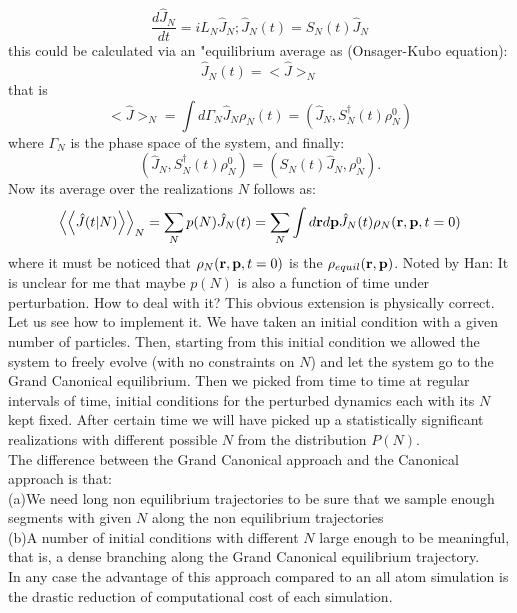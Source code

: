 \documentclass[aps,pre,preprint,unsortedaddress]{revtex4}
\newcommand{\bluec}[1]{{\color{blue} #1}}
\begin{document}
\begin{equation}
\frac{d \hat{J}_{N}}{dt}=iL_{N}\hat{J}_{N};\hat{J}_{N}(t)=S_{N}(t)\hat{J}_{N}
\end{equation}
this could be calculated via an "equilibrium average as (Onsager-Kubo equation):
\begin{equation}
\hat{J}_{N}(t)=<\hat{J}>_{N}
\end{equation}
that is
\begin{equation}
<\hat{J}>_{N}=\int d\Gamma_{N}\hat{J}_{N}\rho_{N}(t)=(\hat{J}_{N},S^{\dagger}_{N}(t)\rho_{N}^{0})
\end{equation}
where $\Gamma_{N}$ is the phase space of the system, and finally:
\begin{equation}
 (\hat{J}_{N},S^{\dagger}_{N}(t)\rho_{N}^{0})=(S_{N}(t)\hat{J}_{N}, \rho_{N}^{0}).
\end{equation}
Now its average over the realizations $N$ follows as:
\begin{equation}
\left<\left<\hat{J}(t|N)\right>\right>_{N}=\sum_{N}p(N)\hat{J}_{N}(t)=\sum_{N}\int d{\bf r}d{\bf p}\hat{J}_{N}(t)\rho_{N}({\bf r},{\bf p}, t=0)
\end{equation}
where it must be noticed that $\rho_{N}({\bf r},{\bf p}, t=0)$ is the $\rho_{equil}({\bf r},{\bf p})$.
\bluec{Noted by Han:
  It is unclear for me that maybe $p(N)$ is also a function of time
  under perturbation. How to deal with it?}
This obvious extension is physically correct.
Let us see how to implement it. We have taken an initial condition with a given number of particles. Then, starting from this initial condition we allowed the system to freely evolve (with no constraints on $N$) and let the system go to the Grand Canonical equilibrium. Then we picked from time to time at regular intervals of time, initial conditions for the perturbed dynamics each with its $N$ kept fixed. After certain time we will have picked up a statistically significant realizations with different possible $N$ from the distribution $P(N)$.\\
The difference between the Grand Canonical approach and the Canonical approach is that:\\
(a)We need long non equilibrium trajectories to be sure that we sample enough segments with given $N$ along the non equilibrium trajectories\\
(b)A number of initial conditions with different $N$ large enough to be meaningful, that is, a dense branching along the Grand Canonical equilibrium trajectory.\\
In any case the advantage of this approach compared to an all atom simulation is the drastic reduction of computational cost of each simulation. 
\end{document}

